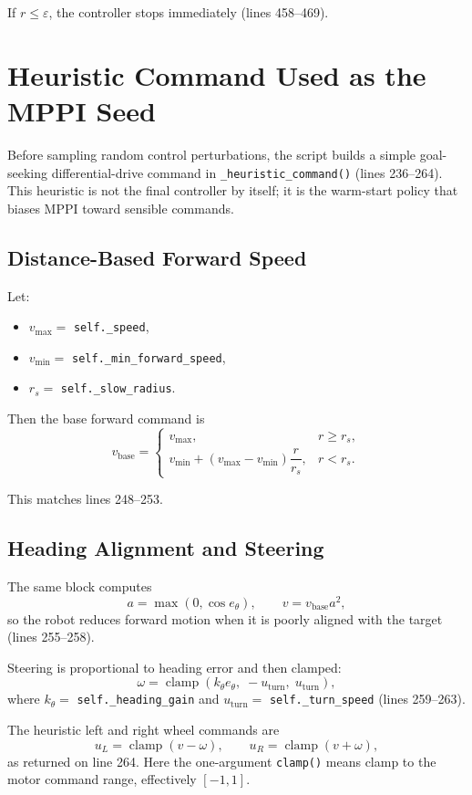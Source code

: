 \documentclass[11pt]{article}
\begin{document}
If $r \le \varepsilon$, the controller stops immediately (lines 458--469).

\section{Heuristic Command Used as the MPPI Seed}

Before sampling random control perturbations, the script builds a simple
goal-seeking differential-drive command in \texttt{\_heuristic\_command()}
(lines 236--264). This heuristic is not the final controller by itself; it is
the warm-start policy that biases MPPI toward sensible commands.

\subsection{Distance-Based Forward Speed}

Let:
\begin{itemize}
\item $v_{\max} =$ \texttt{self.\_speed},
\item $v_{\min} =$ \texttt{self.\_min\_forward\_speed},
\item $r_s =$ \texttt{self.\_slow\_radius}.
\end{itemize}

Then the base forward command is
\[
v_{\mathrm{base}} =
\begin{cases}
v_{\max}, & r \ge r_s, \\
v_{\min} + (v_{\max} - v_{\min}) \dfrac{r}{r_s}, & r < r_s.
\end{cases}
\]

This matches lines 248--253.

\subsection{Heading Alignment and Steering}

The same block computes
\[
a = \max(0, \cos e_\theta),
\qquad
v = v_{\mathrm{base}} a^2,
\]
so the robot reduces forward motion when it is poorly aligned with the target
(lines 255--258).

Steering is proportional to heading error and then clamped:
\[
\omega = \operatorname{clamp}\!\left(k_\theta e_\theta,\; -u_{\mathrm{turn}},\; u_{\mathrm{turn}}\right),
\]
where $k_\theta =$ \texttt{self.\_heading\_gain} and
$u_{\mathrm{turn}} =$ \texttt{self.\_turn\_speed} (lines 259--263).

The heuristic left and right wheel commands are
\[
u_L = \operatorname{clamp}(v - \omega),
\qquad
u_R = \operatorname{clamp}(v + \omega),
\]
as returned on line 264. Here the one-argument \texttt{clamp()} means clamp to
the motor command range, effectively $[-1,1]$.
\end{document}

